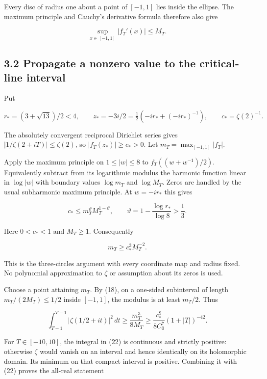 \documentclass[
  11pt,
]{article}
\begin{document}
Every disc of radius one about a point of \([-1,1]\) lies inside the
ellipse. The maximum principle and Cauchy's derivative formula therefore
also give

\[
 \sup_{x\in[-1,1]}|f_T'(x)|\le M_T.                                    \tag{18}
\]

\subsection{3.2 Propagate a nonzero value to the critical-line
interval}\label{propagate-a-nonzero-value-to-the-critical-line-interval}

Put

\[
 r_*=(3+\sqrt{13})/2<4,\qquad
 z_*=-3i/2=\tfrac12(-ir_*+(-ir_*)^{-1}),\qquad
 c_* =\zeta(2)^{-1}.                                                    \tag{19}
\]

The absolutely convergent reciprocal Dirichlet series gives
\(|1/\zeta(2+iT)|\le\zeta(2)\), so \(|f_T(z_*)|\ge c_*>0\). Let
\(m_T=\max_{[-1,1]}|f_T|\).

Apply the maximum principle on \(1\le|w|\le8\) to \(f_T((w+w^{-1})/2)\).
Equivalently subtract from its logarithmic modulus the harmonic function
linear in \(\log|w|\) with boundary values \(\log m_T\) and
\(\log M_T\). Zeros are handled by the usual subharmonic maximum
principle. At \(w=-ir_*\) this gives

\[
 c_*\le m_T^{\vartheta}M_T^{1-\vartheta},\qquad
 \vartheta=1-\frac{\log r_*}{\log8}>\frac13.
                                                                         \tag{20}
\]

Here \(0<c_*<1\) and \(M_T\ge1\). Consequently

\[
 m_T\ge c_*^3M_T^{-2}.                                                 \tag{21}
\]

This is the three-circles argument with every coordinate map and radius
fixed. No polynomial approximation to \(\zeta\) or assumption about its
zeros is used.

Choose a point attaining \(m_T\). By (18), on a one-sided subinterval of
length \(m_T/(2M_T)\le1/2\) inside \([-1,1]\), the modulus is at least
\(m_T/2\). Thus

\[
 \int_{T-1}^{T+1}|\zeta(1/2+it)|^2\,dt
 \ge \frac{m_T^3}{8M_T}
 \ge \frac{c_*^9}{8C_0^7}(1+|T|)^{-42}.                                \tag{22}
\]

For \(T\in[-10,10]\), the integral in (22) is continuous and strictly
positive: otherwise \(\zeta\) would vanish on an interval and hence
identically on its holomorphic domain. Its minimum on that compact
interval is positive. Combining it with (22) proves the all-real
statement
\end{document}
